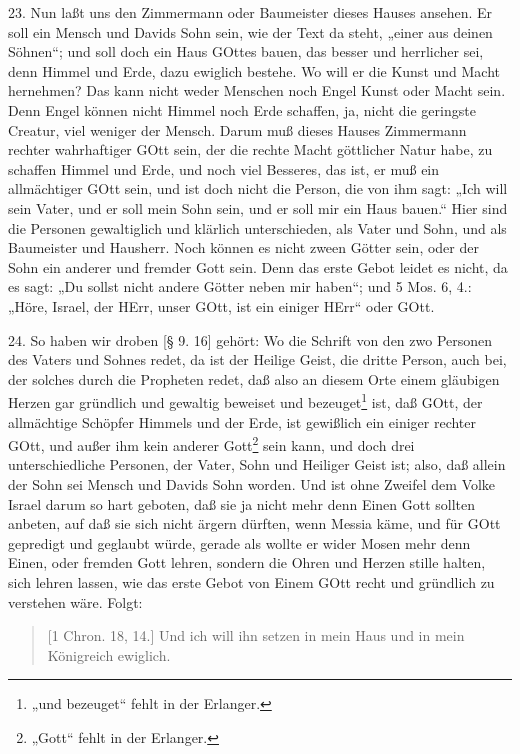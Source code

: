 23. Nun laßt uns den Zimmermann oder Baumeister dieses Hauses ansehen. Er soll ein Mensch und Davids Sohn sein, wie der Text da steht, „einer aus deinen Söhnen“; und soll doch ein Haus GOttes bauen, das besser und herrlicher sei, denn Himmel und Erde, dazu ewiglich bestehe. Wo will er die Kunst und Macht hernehmen? Das kann nicht weder Menschen noch Engel Kunst oder Macht sein. Denn Engel können nicht Himmel noch Erde schaffen, ja, nicht die geringste Creatur, viel weniger der Mensch. Darum muß dieses Hauses Zimmermann rechter wahrhaftiger GOtt sein, der die rechte Macht göttlicher Natur habe, zu schaffen Himmel und Erde, und noch viel Besseres, das ist, er muß ein allmächtiger GOtt sein, und ist doch nicht die Person, die von ihm sagt: „Ich will sein Vater, und er soll mein Sohn sein, und er soll mir ein Haus bauen.“ Hier sind die Personen gewaltiglich und klärlich unterschieden, als Vater und Sohn, und als Baumeister und Hausherr. Noch können es nicht zween Götter sein, oder der Sohn ein anderer und fremder Gott sein. Denn das erste Gebot leidet es nicht, da es sagt: „Du sollst nicht andere Götter neben mir haben“; und 5 Mos. 6, 4.: „Höre, Israel, der HErr, unser GOtt, ist ein einiger HErr“ oder GOtt.

24. So haben wir droben [§ 9. 16] gehört: Wo die Schrift von den zwo Personen des Vaters und Sohnes redet, da ist der Heilige Geist, die dritte Person, auch bei, der solches durch die
Propheten redet, daß also an diesem Orte einem gläubigen Herzen gar gründlich und gewaltig beweiset und bezeuget\footnote{„und bezeuget“ fehlt in der Erlanger.} ist, daß GOtt, der allmächtige Schöpfer Himmels und der Erde, ist gewißlich ein einiger rechter GOtt, und außer ihm kein anderer Gott\footnote{„Gott“ fehlt in der Erlanger.} sein kann, und doch drei unterschiedliche Personen, der Vater, Sohn und Heiliger Geist ist; also, daß allein der Sohn sei Mensch und Davids Sohn worden. Und ist ohne Zweifel dem Volke Israel darum so hart geboten, daß sie ja nicht mehr denn Einen Gott sollten anbeten, auf daß sie sich nicht ärgern dürften, wenn Messia käme, und für GOtt gepredigt und geglaubt würde, gerade als wollte er wider Mosen mehr denn Einen, oder fremden Gott lehren, sondern die Ohren und Herzen stille halten, sich lehren lassen, wie das erste Gebot von Einem GOtt recht und gründlich zu verstehen wäre. Folgt:

\begin{quote}
[1 Chron. 18, 14.] Und ich will ihn setzen in mein Haus und in mein Königreich ewiglich.
\end{quote}

